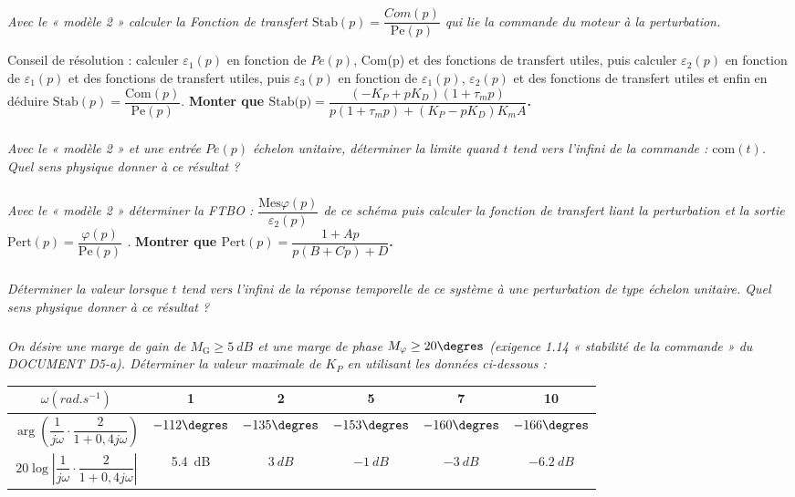 \documentclass[10pt,fleqn]{article} %
\begin{document}
\subparagraph{\label{q27}}\textit{Avec le « modèle 2 » calculer la Fonction de transfert $\text{Stab}(p)=\dfrac{Com(p)}{\text{Pe}(p)}$  qui lie la commande du moteur à la perturbation.}

Conseil de résolution : calculer $\varepsilon_1(p)$ en fonction de $Pe(p)$, Com(p) et des fonctions de transfert utiles, puis
calculer $\varepsilon_2(p)$
en fonction de $\varepsilon_1(p)$
et des fonctions de transfert utiles, 
puis $\varepsilon_3(p)$
en fonction de $\varepsilon_1(p)$, $\varepsilon_2(p)$ et des fonctions de transfert utiles et enfin en déduire 
 $\text{Stab}(p)=\dfrac{\text{Com}(p)}{\text{Pe}(p)}$.
\textbf{Monter que $\text{Stab(p)}=\dfrac{(-K_P+pK_D)(1+\tau_m p)}{p(1+\tau_m p)+(K_P-pK_D)K_m A}$.}
\subparagraph{\label{q28}}\textit{Avec le « modèle 2 » et une entrée $Pe(p)$ échelon unitaire, déterminer la limite quand $t$ tend vers l’infini de la commande : $\text{com}(t)$. Quel sens physique donner à ce résultat ?}

\subparagraph{\label{q29}}\textit{Avec le « modèle 2 » déterminer la FTBO :  $\dfrac{\text{Mes}\varphi(p)}{\varepsilon_2(p)}$ de ce schéma puis calculer la fonction de transfert liant la perturbation et la sortie $\text{Pert}(p)=\dfrac{\varphi(p)}{\text{Pe}(p)}$ .} \textbf{Montrer que $\text{Pert}(p)=\dfrac{1+Ap}{p(B+Cp) + D}$.}

\subparagraph{\label{q30}}\textit{Déterminer la valeur lorsque $t$ tend vers l’infini de la réponse temporelle de ce système à une perturbation de type échelon unitaire. Quel sens physique donner à ce résultat ?}


\subparagraph{\label{q31}}\textit{On désire une marge de gain de $M_\text{G} \geq \SI{5}{dB}$ et une marge de phase $M_{\varphi}\geq 20\degres$ (exigence 1.14 « stabilité de la commande » du DOCUMENT D5-a). Déterminer la valeur maximale de $K_P$ en utilisant les données ci-dessous :}

\begin{center}
\begin{tabular}{|c|c|c|c|c|c|}
\hline
$\omega (\si{rad.s^{-1}})$ & 1 & 2 & 5 & 7 & 10 \\ \hline
$\arg\left( \dfrac{1}{j\omega} \cdot \dfrac{2}{1+0,4 j\omega}\right)$&  $-112\degres$&$-135\degres$&$-153\degres$&$-160\degres$&$-166\degres$ \\ \hline
$20\log \left| \dfrac{1}{j\omega} \cdot \dfrac{2}{1+0,4 j\omega}\right|$&
\SI{5,4}{dB} & $\SI{3}{dB}$ & $-\SI{1}{dB}$ & $-\SI{3}{dB}$ & $-\SI{6,2}{dB}$ \\ \hline
\end{tabular}
\end{center}
\end{document}
